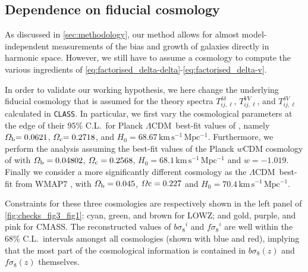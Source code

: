 \documentclass[astrosymb,twocolumn]{aastex631}
\newcommand{\bs}{\ensuremath{b\sigma_8}}
\renewcommand{\fs}{\ensuremath{f\!\sigma_8}}
\newcommand{\lcdm}{\(\Lambda\)CDM}
\let\Omega\varOmega
\begin{document}
\subsection{Dependence on fiducial cosmology}
As discussed in \autoref{sec:methodology}, our method allows for almost model-independent measurements of the bias and growth of galaxies directly in harmonic space. However, we still have to assume a cosmology to compute the various ingredients of \autoref{eq:factorised_delta-delta}-\ref{eq:factorised_delta-v}.

In order to validate our working hypothesis, we here change the underlying fiducial cosmology that is assumed for the theory spectra \(T^{\delta\delta}_{ij,\ell}\), \(T^{VV}_{ij,\ell}\), and \(T^{\delta V}_{ij,\ell}\) calculated in \texttt{CLASS}. In particular, we first vary the cosmological parameters at the edge of their \(95\%\) C.L.\ for Planck \lcdm\ best-fit values of \citep{Ade2015}, namely \(\Omega_{\rm b}{=0.0621}\), \(\Omega_{\rm c}{=0.2718}\), and \(H_{0}{=68.67\,\mathrm{km\,s^{-1}\,Mpc^{-1}}}\). Furthermore, we perform the analysis assuming the best-fit values of the Planck \(w\)CDM cosmology of \citep{Ade2015} with \(\Omega_{\rm b}=0.04802\), \(\Omega_{\rm c}=0.2568\), \(H_0=68.1\,\mathrm{km\,s^{-1}\,Mpc^{-1}}\) and \(w=-1.019\). Finally we consider a more significantly different cosmology as the \lcdm\ best-fit from WMAP7 \citep{Komatsu2011}, with \(\Omega_{\rm b}=0.045\), \(\Omega{\rm c}=0.227\) and \(H_0=70.4\,\mathrm{km\,s^{-1}\,Mpc^{-1}}\).

Constraints for these three cosmologies are respectively shown in the left panel of \autoref{fig:checks_fig3_fig1}: cyan, green, and brown for LOWZ; and gold, purple, and pink for CMASS. The reconstructed values of \(\bs^i\) and \(\fs^i\) are well within the \(68\%\) C.L.\ intervals amongst all cosmologies (shown with blue and red), implying that the most part of the cosmological information is contained in \(\bs(z)\) and \(\fs(z)\) themselves.
\end{document}
